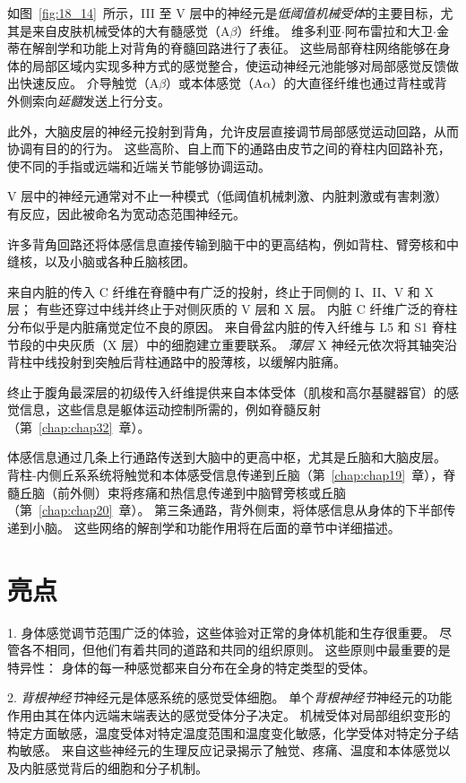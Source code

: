 如图~\ref{fig:18_14}~所示，III 至 V 层中的神经元是\textit{低阈值机械受体}的主要目标，尤其是来自皮肤机械受体的大有髓感觉（A$\beta$）纤维。
维多利亚$\cdot$阿布雷拉和大卫$\cdot$金蒂在解剖学和功能上对背角的脊髓回路进行了表征。
这些局部脊柱网络能够在身体的局部区域内实现多种方式的感觉整合，使运动神经元池能够对局部感觉反馈做出快速反应。
介导触觉（A$\beta$）或本体感觉（A$\alpha$）的大直径纤维也通过背柱或背外侧索向\textit{延髓}发送上行分支。


此外，大脑皮层的神经元投射到背角，允许皮层直接调节局部感觉运动回路，从而协调有目的的行为。
这些高阶、自上而下的通路由皮节之间的脊柱内回路补充，使不同的手指或远端和近端关节能够协调运动。


V 层中的神经元通常对不止一种模式（低阈值机械刺激、内脏刺激或有害刺激）有反应，因此被命名为宽动态范围神经元。


许多背角回路还将体感信息直接传输到脑干中的更高结构，例如背柱、臂旁核和中缝核，以及小脑或各种丘脑核团。


来自内脏的传入 C 纤维在脊髓中有广泛的投射，终止于同侧的 I、II、V 和 X 层；
有些还穿过中线并终止于对侧灰质的 V 层和 X 层。
内脏 C 纤维广泛的脊柱分布似乎是内脏痛觉定位不良的原因。 
来自骨盆内脏的传入纤维与 L5 和 S1 脊柱节段的中央灰质（X 层）中的细胞建立重要联系。 
\textit{薄层} X 神经元依次将其轴突沿背柱中线投射到突触后背柱通路中的股薄核，以缓解内脏痛。


终止于腹角最深层的初级传入纤维提供来自本体受体（肌梭和高尔基腱器官）的感觉信息，这些信息是躯体运动控制所需的，例如脊髓反射（第~\ref{chap:chap32}~章）。


体感信息通过几条上行通路传送到大脑中的更高中枢，尤其是丘脑和大脑皮层。
背柱-内侧丘系系统将触觉和本体感受信息传递到丘脑（第~\ref{chap:chap19}~章），脊髓丘脑（前外侧）束将疼痛和热信息传递到中脑臂旁核或丘脑（第~\ref{chap:chap20}~章）。
第三条通路，背外侧束，将体感信息从身体的下半部传递到小脑。
这些网络的解剖学和功能作用将在后面的章节中详细描述。




\section{亮点}


1. 身体感觉调节范围广泛的体验，这些体验对正常的身体机能和生存很重要。
尽管各不相同，但他们有着共同的道路和共同的组织原则。
这些原则中最重要的是特异性：
身体的每一种感觉都来自分布在全身的特定类型的受体。 


2. \textit{背根神经节}神经元是体感系统的感觉受体细胞。
单个\textit{背根神经节}神经元的功能作用由其在体内远端末端表达的感觉受体分子决定。
机械受体对局部组织变形的特定方面敏感，温度受体对特定温度范围和温度变化敏感，化学受体对特定分子结构敏感。
来自这些神经元的生理反应记录揭示了触觉、疼痛、温度和本体感觉以及内脏感觉背后的细胞和分子机制。 


